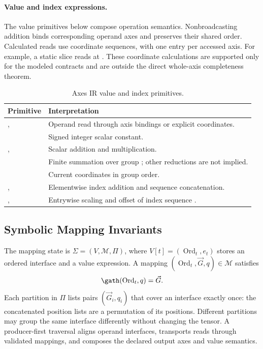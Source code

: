 \paragraph{Value and index expressions.}
\label{app:value-index-expressions}
The value primitives below compose operation semantics. Nonbroadcasting
addition binds corresponding operand axes and preserves their shared
order. Calculated reads use coordinate sequences, with one entry per
accessed axis. For example, a static slice reads at
. These coordinate calculations
are supported only for the modeled contracts and are outside the direct
whole-axis completeness theorem.
\begin{table}[!htbp]
\caption{Axes IR value and index primitives.}
\label{tab:axes-ir-value-index-primitives}
\small
\begin{tabularx}{\linewidth}{@{}lY@{}}\toprule
Primitive & Interpretation\\\midrule
{},  & Operand read through axis bindings or explicit coordinates.\\
 & Signed integer scalar constant.\\
,  & Scalar addition and multiplication.\\
 & Finite summation over group ; other reductions are not implied.\\
 & Current coordinates in group order.\\
,  & Elementwise index addition and sequence concatenation.\\
,  & Entrywise scaling and offset of index sequence .\\\bottomrule
\end{tabularx}
\end{table}

\subsection{Symbolic Mapping Invariants}
\label{app:symbolic-mapping-reassociation}
The mapping state is $\Sigma=(V,\mathcal M,\Pi)$, where
$V[t]=(\operatorname{Ord}_t,e_t)$ stores an ordered interface and a value expression.
A mapping $(\operatorname{Ord}_t,\vec G,q)\in\mathcal M$ satisfies
\begin{equation}
 \gath(\operatorname{Ord}_t,q)=\vec G.
 \label{extended:eq:mapping-invariant}
\end{equation}
Each partition in $\Pi$ lists pairs $(\vec G_i,q_i)$ that cover an
interface exactly once: the concatenated position lists are a permutation
of its positions. Different partitions may group the same interface
differently without changing the tensor. A producer-first traversal
aligns operand interfaces, transports reads through validated mappings,
and composes the declared output axes and value semantics.

